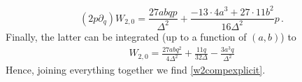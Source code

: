\documentclass{article}
\theoremstyle{definition}
\numberwithin{equation}{section}
\begin{document}
\begin{equation}\label{a2eq15}
    (2p\partial_q)W_{2,0}=\frac{27abqp}{\Delta^2}+\frac{- 13\cdot 4a^3+ 27\cdot 11 b^2}{16\Delta^2}p\,.
\end{equation}
Finally, the latter can be integrated (up to a function of $(a,b)$) to 
\begin{equation*}
\begin{split}
    W_{2,0}=\frac{27abq^2}{4\Delta^2}+\frac{11q}{32\Delta}-\frac{3a^3q}{\Delta^2}
\end{split}
\end{equation*}
Hence, joining everything together we find \eqref{w2compexplicit}.

   

\end{document}
